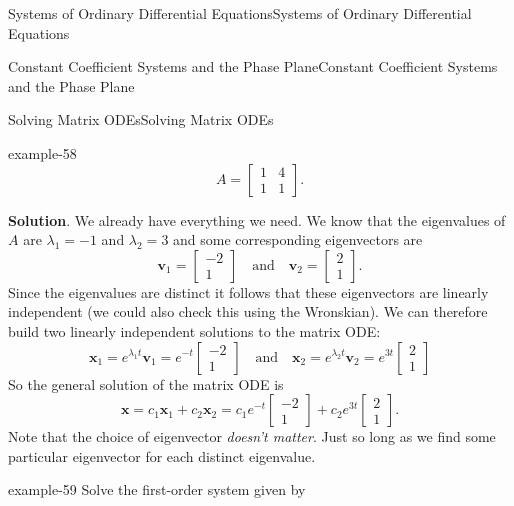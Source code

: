 \documentclass[10pt,]{book}
\numberwithin{equation}{section}
\renewcommand{\vec}[1]{\mathbf{#1}}
\newcommand{\qq}[1]{\quad\text{#1}\quad}
\newcommand{\amp}{&}
\begin{document}
\begin{chapterptx}{Systems of Ordinary Differential Equations}{}{Systems of Ordinary Differential Equations}{}{}
\begin{sectionptx}{Constant Coefficient Systems and the Phase Plane}{}{Constant Coefficient Systems and the Phase Plane}{}{}
\begin{subsectionptx}{Solving Matrix ODEs}{}{Solving Matrix ODEs}{}{}
\begin{example}{}{example-58}
\begin{equation*}
A = \begin{bmatrix}1\amp 4\\1\amp 1\end{bmatrix}.
\end{equation*}
%
\par\smallskip%
\noindent\textbf{Solution}.\hypertarget{solution-55}{}\quad%
\hypertarget{p-346}{}%
We already have everything we need. We know that the eigenvalues of \(A\) are \(\lambda_{1}=-1\) and \(\lambda_{2}=3\) and some corresponding eigenvectors are%
\begin{equation*}
\vec{v}_{1} = \begin{bmatrix}-2\\1\end{bmatrix}\qq{and} \vec{v}_{2} = \begin{bmatrix}2\\1\end{bmatrix}.
\end{equation*}
Since the eigenvalues are distinct it follows that these eigenvectors are linearly independent (we could also check this using the Wronskian). We can therefore build two linearly independent solutions to the matrix ODE:%
\begin{equation*}
\vec{x}_{1} = e^{\lambda_{1}t}\vec{v}_{1} = e^{-t}\begin{bmatrix}-2\\1\end{bmatrix}\qq{and} \vec{x}_{2} = e^{\lambda_{2}t}\vec{v}_{2} = e^{3t}\begin{bmatrix}2\\1\end{bmatrix}
\end{equation*}
So the general solution of the matrix ODE is%
\begin{equation*}
\vec{x} = c_{1}\vec{x}_{1} + c_{2}\vec{x}_{2} = c_{1}e^{-t}\begin{bmatrix}-2\\1\end{bmatrix} + c_{2}e^{3t}\begin{bmatrix}2\\1\end{bmatrix}.
\end{equation*}
Note that the choice of eigenvector \emph{doesn't matter}. Just so long as we find some particular eigenvector for each distinct eigenvalue.%
\end{example}
\begin{example}{}{example-59}%
\hypertarget{p-347}{}%
Solve the first-order system given by%

\end{example}
\end{subsectionptx}
\end{sectionptx}
\end{chapterptx}
\end{document}

